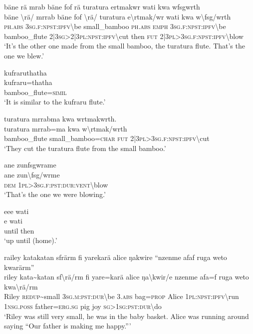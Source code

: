 \ea\label{ex:12:a802}
bäne rä mrab bäne fof rä turatura ertmakwr wati kwa wfsgwrth\\
\gll bäne	{\textbackslash}rä/	mrrab	bäne	fof	{\textbackslash}rä/	turatura	e{\textbackslash}rtmak/wr	wati	kwa	w{\textbackslash}fsg/wrth\\
     \textsc{ph}.\textsc{abs}	3\textsc{sg}.\textsc{f}:\textsc{npst}:\textsc{ipfv}{\textbackslash}be	small\_bamboo	\textsc{ph}.\textsc{abs}	\textsc{emph}	3\textsc{sg}.\textsc{f}:\textsc{npst}:\textsc{ipfv}{\textbackslash}be	bamboo\_flute	2|3\textsc{sg}>2|3\textsc{pl}:\textsc{npst}:\textsc{ipfv}{\textbackslash}cut	then	\textsc{fut}	2|3\textsc{pl}>3\textsc{sg}.\textsc{f}:\textsc{npst}:\textsc{ipfv}{\textbackslash}blow\\
\glt `It's the other one made from the small bamboo, the turatura flute. That's the one we blew.'
\z

\ea\label{ex:12:a803}
kufraruthatha\\
\gll kufraru=thatha\\
     bamboo\_flute=\textsc{simil}\\
\glt `It is similar to the kufraru flute.'
\z

\ea\label{ex:12:a804}
turatura mrrabma kwa wrtmakwrth.\\
\gll turatura	mrrab=ma	kwa	w{\textbackslash}rtmak/wrth\\
     bamboo\_flute	small\_bamboo=\textsc{char}	\textsc{fut}	2|3\textsc{pl}>3\textsc{sg}.\textsc{f}:\textsc{npst}:\textsc{ipfv}{\textbackslash}cut\\
\glt `They cut the turatura flute from the small bamboo.'
\z

\ea\label{ex:12:a806}
ane zunfsgwrame\\
\gll ane	zun{\textbackslash}fsg/wrme\\
     \textsc{dem}	1\textsc{pl}>3\textsc{sg}.\textsc{f}:\textsc{pst}:\textsc{dur}:\textsc{vent}{\textbackslash}blow\\
\glt `That's the one we were blowing.'
\z

\ea\label{ex:12:a807}
eee wati\\
\gll e	wati\\
     until	then\\
\glt `up until (home).'
\z

\ea\label{ex:12:a808}
railey katakatan sfrärm fi yarekarä alice ŋakwire ``nzenme afaf ruga weto kwarärm''\\
\gll riley	kata{\textasciitilde}katan	sf{\textbackslash}rä/rm	fi	yare=karä	alice	ŋa{\textbackslash}kwir/e	nzenme	afa=f	ruga	weto	kwa{\textbackslash}rä/rm\\
     Riley	\textsc{redup}{\textasciitilde}small	3\textsc{sg}.\textsc{m}:\textsc{pst}:\textsc{dur}{\textbackslash}be	3.\textsc{abs}	bag=\textsc{prop}	Alice	1\textsc{pl}:\textsc{npst}:\textsc{ipfv}{\textbackslash}run	1\textsc{nsg}.\textsc{poss}	father=\textsc{erg}.\textsc{sg}	pig	joy	\textsc{sg}>1\textsc{sg}:\textsc{pst}:\textsc{dur}{\textbackslash}do\\
\glt `Riley was still very small, he was in the baby basket. Alice was running around saying ``Our father is making me happy.'''
\z


